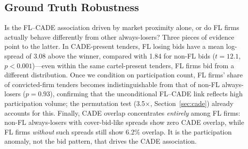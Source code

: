 
\subsection{Ground Truth Robustness}
\label{sec:ground_truth}

Is the FL--CADE association driven by market proximity alone, or do FL
firms actually behave differently from other always-losers? Three pieces
of evidence point to the latter. In CADE-present tenders, FL losing
bids have a mean log-spread of 3.08 above the winner, compared with
1.84 for non-FL bids ($t = 12.1$, $p < 0.001$)---even within the same
cartel-present tenders, FL firms bid from a different distribution.
Once we condition on participation count, FL firms' share of
convicted-firm tenders becomes indistinguishable from that of non-FL
always-losers ($p = 0.93$), confirming that the unconditional FL--CADE
link reflects high participation volume; the permutation test
(3.5$\times$, Section~\ref{sec:cade}) already accounts for this.
Finally, CADE overlap concentrates \emph{entirely} among FL firms:
non-FL always-losers with cover-bid-like spreads show zero CADE
overlap, while FL firms \emph{without} such spreads still show 6.2\%
overlap. It is the participation anomaly, not the bid pattern, that
drives the CADE association.
